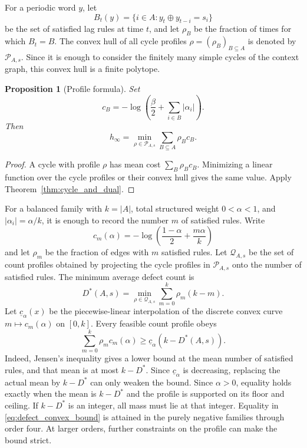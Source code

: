 \documentclass[11pt,a4paper]{article}
\newtheorem{proposition}[theorem]{Proposition}
\begin{document}
For a periodic word $y$, let
\[
    B_t(y)=\{i\in A:y_t\oplus y_{t-i}=s_i\}
\]
be the set of satisfied lag rules at time $t$, and let $\rho_B$ be the
fraction of times for which $B_t=B$.  The convex hull of all cycle
profiles $\rho=(\rho_B)_{B\subseteq A}$ is denoted by
$\mathcal P_{A,s}$.  Since it is enough to consider the finitely many
simple cycles of the context graph, this convex hull is a finite
polytope.

\begin{proposition}[Profile formula]
\label{prop:profile_formula}
Set
\[
    c_B=-\log\left(\frac{\beta}{2}
          +\sum_{i\in B}|\alpha_i|\right).
\]
Then
\begin{equation}
\label{eq:profile_formula}
    h_\infty
    =\min_{\rho\in\mathcal P_{A,s}}
      \sum_{B\subseteq A}\rho_Bc_B.
\end{equation}
\end{proposition}

\begin{proof}
A cycle with profile $\rho$ has mean cost $\sum_B\rho_Bc_B$.
Minimizing a linear function over the cycle profiles or their convex
hull gives the same value.  Apply Theorem~\ref{thm:cycle_and_dual}.
\end{proof}

For a balanced family with $k=|A|$, total structured weight
$0<\alpha<1$, and $|\alpha_i|=\alpha/k$, it is enough to record the number $m$ of
satisfied rules.  Write
\[
    c_m(\alpha)=-\log\left(\frac{1-\alpha}{2}
                         +\frac{m\alpha}{k}\right)
\]
and let $\rho_m$ be the fraction of edges with $m$ satisfied rules.
Let $\mathcal Q_{A,s}$ be the set of count profiles obtained by
projecting the cycle profiles in $\mathcal P_{A,s}$ onto the number of
satisfied rules.  The minimum average defect count is
\[
    D^*(A,s)=\min_{\rho\in\mathcal Q_{A,s}}
             \sum_{m=0}^k\rho_m(k-m).
\]
Let $\underline c_\alpha(x)$ be the piecewise-linear interpolation of
the discrete convex curve $m\mapsto c_m(\alpha)$ on $[0,k]$.  Every
feasible count profile obeys
\begin{equation}
\label{eq:defect_convex_bound}
    \sum_{m=0}^k\rho_m c_m(\alpha)
    \ge \underline c_\alpha\!\left(k-D^*(A,s)\right).
\end{equation}
Indeed, Jensen's inequality gives a lower bound at the mean number of
satisfied rules, and that mean is at most $k-D^*$.  Since
$\underline c_\alpha$ is decreasing, replacing the actual mean by
$k-D^*$ can only weaken the bound.  Since $\alpha>0$, equality
holds exactly when the mean is $k-D^*$ and the profile is supported
on its floor and ceiling.  If $k-D^*$ is an integer, all mass must
lie at that integer.  Equality in \eqref{eq:defect_convex_bound} is attained
in the purely negative families through order four.  At larger orders,
further constraints on the profile can make the bound strict.
\end{document}
